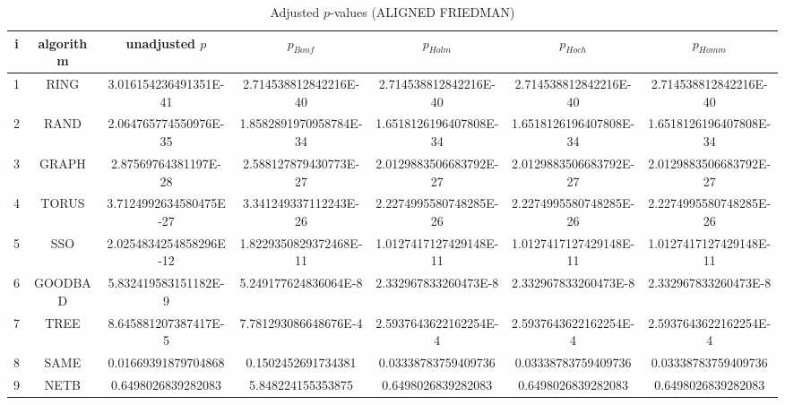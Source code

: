 \documentclass[a4paper,10pt]{article}
\begin{document}
\begin{landscape}
\begin{table}[!htp]
\centering\scriptsize
\caption{Adjusted $p$-values (ALIGNED FRIEDMAN)}
\begin{tabular}{ccccccc}
i&algorithm&unadjusted $p$&$p_{Bonf}$&$p_{Holm}$&$p_{Hoch}$&$p_{Homm}$\\
\hline
1& RING&3.016154236491351E-41&2.714538812842216E-40&2.714538812842216E-40&2.714538812842216E-40&2.714538812842216E-40\\
2& RAND&2.064765774550976E-35&1.8582891970958784E-34&1.6518126196407808E-34&1.6518126196407808E-34&1.6518126196407808E-34\\
3& GRAPH&2.87569764381197E-28&2.588127879430773E-27&2.0129883506683792E-27&2.0129883506683792E-27&2.0129883506683792E-27\\
4& TORUS&3.7124992634580475E-27&3.341249337112243E-26&2.2274995580748285E-26&2.2274995580748285E-26&2.2274995580748285E-26\\
5& SSO&2.0254834254858296E-12&1.8229350829372468E-11&1.0127417127429148E-11&1.0127417127429148E-11&1.0127417127429148E-11\\
6& GOODBAD&5.832419583151182E-9&5.249177624836064E-8&2.332967833260473E-8&2.332967833260473E-8&2.332967833260473E-8\\
7& TREE&8.645881207387417E-5&7.781293086648676E-4&2.5937643622162254E-4&2.5937643622162254E-4&2.5937643622162254E-4\\
8& SAME&0.01669391879704868&0.1502452691734381&0.03338783759409736&0.03338783759409736&0.03338783759409736\\
9& NETB&0.6498026839282083&5.848224155353875&0.6498026839282083&0.6498026839282083&0.6498026839282083\\
\hline
\end{tabular}
\end{table}


\end{landscape}
\end{document}
